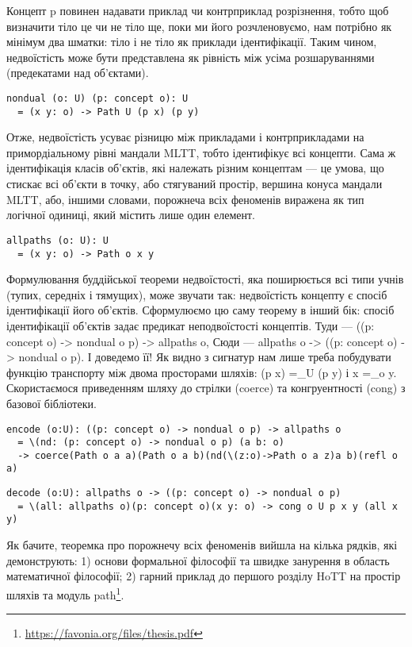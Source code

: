Концепт p повинен надавати приклад чи контрприклад розрізнення,
тобто щоб визначити тіло це чи не тіло ще, поки ми його розчленовуємо,
нам потрібно як мінімум два шматки: тіло і не тіло як приклади ідентифікації.
Таким чином, недвоїстість може бути представлена як рівність між усіма
розшаруваннями (предекатами над об'єктами).

\begin{lstlisting}
nondual (o: U) (p: concept o): U
  = (x y: o) -> Path U (p x) (p y)
\end{lstlisting}

Отже, недвоїстість усуває різницю між прикладами і контрприкладами
на примордіальному рівні мандали MLTT, тобто ідентифікує всі концепти.
Сама ж ідентифікація класів об'єктів, які належать різним концептам ---
це умова, що стискає всі об'єкти в точку, або стягуваний простір, вершина
конуса мандали MLTT, або, іншими словами, порожнеча всіх феноменів виражена
як тип логічної одиниці, який містить лише один елемент.

\begin{lstlisting}
allpaths (o: U): U
  = (x y: o) -> Path o x y
\end{lstlisting}

Формулювання буддійської теореми недвоїстості, яка поширюється всі
типи учнів (тупих, середніх і тямущих), може звучати так: недвоїстість
концепту є спосіб ідентифікації його об'єктів. Сформулюємо цю саму теорему
в інший бік: спосіб ідентифікації об'єктів задає предикат неподвоїстості
концептів. Туди --- ((p: concept o) -> nondual o p) -> allpaths o,
Сюди --- allpaths o -> ((p: concept o) -> nondual o p). І доведемо її!
Як видно з сигнатур нам лише треба побудувати функцію транспорту між
двома просторами шляхів: (p x) =_U (p y) і x =_o y. Скористаємося
приведенням шляху до стрілки (coerce) та конгруентності (cong) з базової бібліотеки.

\begin{lstlisting}
encode (o:U): ((p: concept o) -> nondual o p) -> allpaths o
  = \(nd: (p: concept o) -> nondual o p) (a b: o)
  -> coerce(Path o a a)(Path o a b)(nd(\(z:o)->Path o a z)a b)(refl o a)
\end{lstlisting}

\begin{lstlisting}
decode (o:U): allpaths o -> ((p: concept o) -> nondual o p)
  = \(all: allpaths o)(p: concept o)(x y: o) -> cong o U p x y (all x y)
\end{lstlisting}

Як бачите, теоремка про порожнечу всіх феноменів вийшла на кілька рядків,
які демонструють: 1) основи формальної філософії та швидке занурення в область
математичної філософії; 2) гарний приклад до першого розділу HoTT на простір
шляхів та модуль path\footnote{\url{https://favonia.org/files/thesis.pdf}}.


